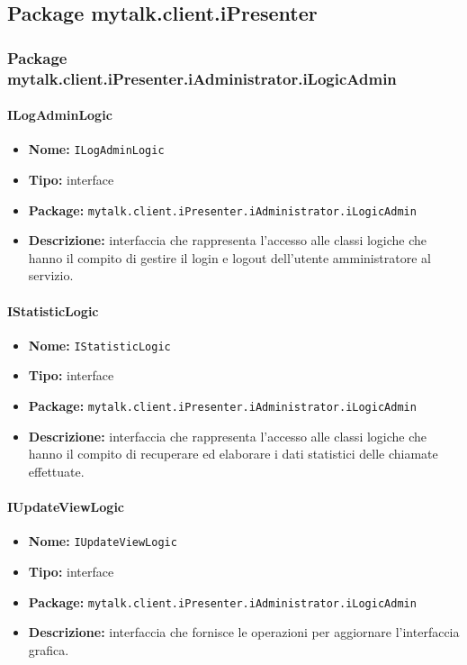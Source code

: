 \newpage
\subsection{Package mytalk.client.iPresenter}

\subsubsection{Package mytalk.client.iPresenter.iAdministrator.iLogicAdmin}

\paragraph{ILogAdminLogic}{
	\begin{itemize}
		\item [] \textbf{Nome:} \texttt{ILogAdminLogic}
		\item [] \textbf{Tipo:} interface
		\item [] \textbf{Package:} \texttt{mytalk.client.iPresenter.iAdministrator.iLogicAdmin}
		\item [] \textbf{Descrizione:} { interfaccia che rappresenta l'accesso alle classi logiche che hanno il compito di gestire il login e logout dell'utente amministratore al servizio.}
	\end{itemize}
}
\paragraph{IStatisticLogic}{
	\begin{itemize}
		\item [] \textbf{Nome:} \texttt{IStatisticLogic}
		\item [] \textbf{Tipo:} interface
		\item [] \textbf{Package:} \texttt{mytalk.client.iPresenter.iAdministrator.iLogicAdmin}
		\item [] \textbf{Descrizione:}{ interfaccia che rappresenta l'accesso alle classi logiche che hanno il compito di recuperare ed elaborare i dati statistici delle chiamate effettuate.}
	\end{itemize}
}

\paragraph{IUpdateViewLogic}{
	\begin{itemize}
		\item [] \textbf{Nome:} \texttt{IUpdateViewLogic}
		\item [] \textbf{Tipo:} interface
		\item [] \textbf{Package:} \texttt{mytalk.client.iPresenter.iAdministrator.iLogicAdmin}
		\item [] \textbf{Descrizione:}{ interfaccia che fornisce le operazioni per aggiornare l'interfaccia grafica.}
	\end{itemize}
}
